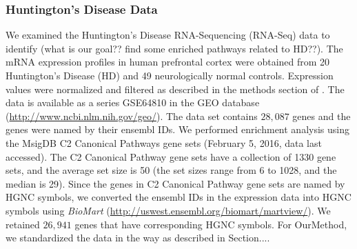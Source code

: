 \documentclass[11pt, a4paper]{article}
\begin{document}
		\subsubsection*{Huntington's Disease Data}
		 We examined the Huntington's Disease RNA-Sequencing (RNA-Seq) data 	\citep{labadorf2015rna}  to identify (what is our goal?? find some enriched pathways related to HD??). The mRNA expression profiles in human prefrontal cortex were obtained from 20 Huntington's Disease (HD) and 49 neurologically normal controls.  Expression values were normalized and filtered as described in the methods section of \citep{labadorf2015rna}.
		 The data is available as a series GSE64810 in the GEO database (\url{http://www.ncbi.nlm.nih.gov/geo/}). The data set contains $28,087$ genes and the genes were named by their ensembl IDs. We performed enrichment analysis using the MsigDB \citep{subramanian2005gene} C2 Canonical Pathways gene sets (February 5, 2016, data last accessed). The C2 Canonical Pathway gene sets have a collection of 1330 gene sets, and the average set size is 50 (the set sizes range from 6 to 1028, and the median is 29). Since the genes in C2 Canonical Pathway gene sets are named by HGNC symbols, we converted the ensembl IDs in the expression data into HGNC symbols using \textit{BioMart} (\url{http://uswest.ensembl.org/biomart/martview/}). We retained $26,941$ genes that have corresponding HGNC symbols. For OurMethod, we standardized the data in the way as described in Section....
		 
\end{document}
